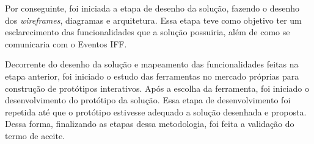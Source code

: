 Por conseguinte, foi iniciada a etapa de desenho da solução, fazendo o desenho dos \textit{wireframes}, diagramas e arquitetura. Essa etapa teve como objetivo ter um esclarecimento das funcionalidades que a solução possuiria, além de como se comunicaria com o Eventos IFF.

Decorrente do desenho da solução e mapeamento das funcionalidades feitas na etapa anterior, foi iniciado o estudo das ferramentas no mercado próprias para construção de protótipos interativos. Após a escolha da ferramenta, foi iniciado o desenvolvimento do protótipo da solução. Essa etapa de desenvolvimento foi repetida até que o protótipo estivesse adequado a solução desenhada e proposta. Dessa forma, finalizando as etapas dessa metodologia, foi feita a validação do termo de aceite.
